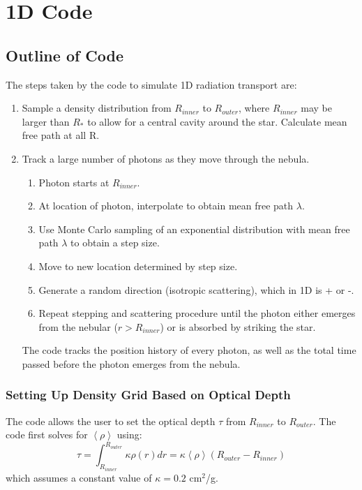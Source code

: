 \documentclass{amsart}
\begin{document}
\section{1D Code}
\subsection{Outline of Code}
The steps taken by the code to simulate 1D radiation transport are:
\begin{enumerate}
\item Sample a density distribution from $R_{inner}$ to $R_{outer}$, where $R_{inner}$ may be larger than $R_*$ to allow for a central cavity around the star. Calculate mean free path at all R.
\item Track a large number of photons as they move through the nebula.
\begin{enumerate}
\item Photon starts at $R_{inner}$.
\item At location of photon, interpolate to obtain mean free path $\lambda$.
\item Use Monte Carlo sampling of an exponential distribution with mean free path $\lambda$ to obtain a step size.
\item Move to new location determined by step size.
\item Generate a random direction (isotropic scattering), which in 1D is + or -.
\item Repeat stepping and scattering procedure until the photon either emerges from the nebular ($r>R_{inner}$) or is absorbed by striking the star.
\end{enumerate}
The code tracks the position history of every photon, as well as the total time passed before the photon emerges from the nebula.
\end{enumerate}
\subsubsection{Setting Up Density Grid Based on Optical Depth}
The code allows the user to set the optical depth $\tau$ from $R_{inner}$ to $R_{outer}$.  The code first solves for $\left<\rho\right>$ using:
\begin{equation}
	\tau = \int_{R_{inner}}^{R_{outer}} \kappa \rho(r) dr
             = \kappa \left<\rho\right> (R_{outer} - R_{inner})
\end{equation}
which assumes a constant value of $\kappa=0.2$ cm$^2$/g.
\end{document}
